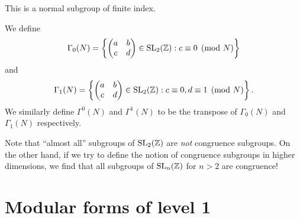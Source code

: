 \documentclass[a4paper]{article}
\begin{document}
This is a normal subgroup of finite index.
\begin{defi}
  We define
  \[
    \Gamma_0(N) =\left\{
      \begin{pmatrix}
        a & b\\
        c & d
      \end{pmatrix}
    \in \mathrm{SL}_2(\mathbb{Z}): c \equiv 0\pmod N\right\}
  \]
  and
  \[
    \Gamma_1(N) =\left\{
      \begin{pmatrix}
        a & b\\
        c & d
      \end{pmatrix}
    \in \mathrm{SL}_2(\mathbb{Z}): c \equiv 0, d\equiv 1 \pmod N\right\}.
  \]
  We similarly define $\Gamma^0(N)$ and $\Gamma^1(N)$ to be the transpose of $\Gamma_0(N)$ and $\Gamma_1(N)$ respectively.
\end{defi}
Note that ``almost all'' subgroups of $\mathrm{SL}_2(\mathbb{Z})$ are \emph{not} congruence subgroups. On the other hand, if we try to define the notion of congruence subgroups in higher dimensions, we find that all subgroups of $\mathrm{SL}_n(\mathbb{Z})$ for $n > 2$ are congruence!

\section{Modular forms of level 1}
\end{document}
